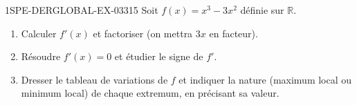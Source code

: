 \begin{exercice}{1SPE-DERGLOBAL-EX-033}{1}{5}
Soit $f(x) = x^3 - 3x^2$ définie sur $\mathbb{R}$.
\begin{enumerate}
\item Calculer $f'(x)$ et factoriser (on mettra $3x$ en facteur).
\item Résoudre $f'(x) = 0$ et étudier le signe de $f'$.
\item Dresser le tableau de variations de $f$ et indiquer la nature (maximum local ou minimum local) de chaque extremum, en précisant sa valeur.
\end{enumerate}
\end{exercice}
